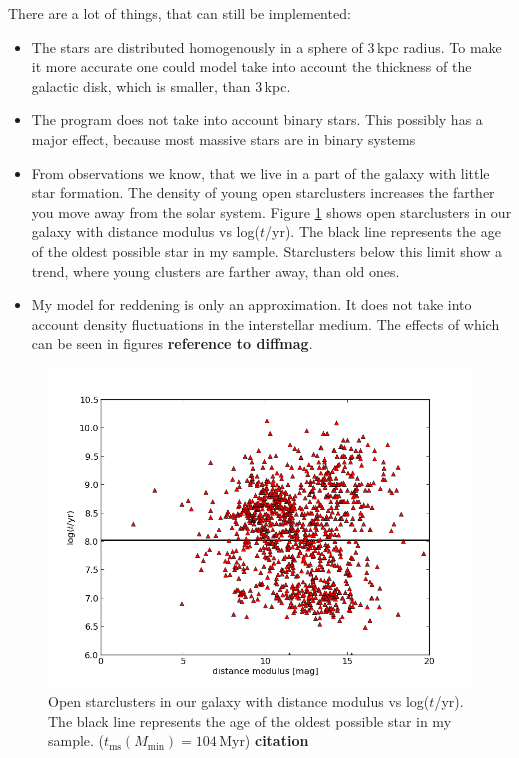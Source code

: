 \documentclass[a4paper,10pt]{article}
\begin{document}
 There are a lot of things, that can still be implemented:\\
 \begin{itemize}
  \item The stars are distributed homogenously in a sphere of 3$\,$kpc radius. To make it more accurate one could model take into account the 
  thickness of the galactic disk, which is smaller, than 3$\,$kpc. 
  \item The program does not take into account binary stars. This possibly has a major effect, because most massive stars are in binary
  systems \citep{2012Sci...337..444S}
  \item From observations we know, that we live in a part of the galaxy with little star formation.  
  The density of young open starclusters increases the farther you move away from the solar system. Figure \ref{clusters} shows open 
  starclusters in our galaxy with distance modulus vs log($t$/yr). The black line represents the age of the oldest possible star in 
  my sample. Starclusters below this limit show a trend, where young clusters are farther away, than old ones.
  \item My model for reddening is only an approximation. It does not take into account density fluctuations in the interstellar medium. 
  The effects of which can be seen in figures \textbf{reference to diffmag}.
 \end{itemize}
 \begin{figure}[h!]
  \includegraphics[width=\textwidth]{clusters}
  \caption{Open starclusters in our galaxy with distance modulus vs log($t$/yr). The black line represents the age of the oldest possible
  star in my sample. ($t_{\mathrm{ms}}(M_{\mathrm{min}})=104\,$Myr) \textbf{citation} \label{clusters}}
 \end{figure}
\end{document}
